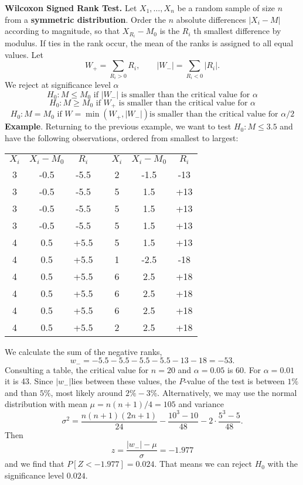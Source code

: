 \documentclass[a4paper,12pt]{article}
\begin{document}
\textbf{Wilcoxon Signed Rank Test.} Let $X_1, \ldots, X_n$ be a random sample of size $n$ from a \textbf{symmetric distribution}. Order the $n$ absolute differences $\left|X_i-M\right|$ according to magnitude, so that $X_{R_i}-M_0$ is the $R_i$ th smallest difference by modulus. If ties in the rank occur, the mean of the ranks is assigned to all equal values.
Let
$$
W_{+}=\sum_{R_i>0} R_i, \quad \quad\left|W_{-}\right|=\sum_{R_i<0}\left|R_i\right| .
$$
We reject at significance level $\alpha$
$$H_0: M \leq M_0\text{ if }\left|W_{-}\right| \text{ is smaller than the critical value for } \alpha$$
$$H_0: M \geq M_0\text{ if }W_{+} \text{ is smaller than the critical value for } \alpha$$
$$H_0: M=M_0\text{ if }W=\min \left(W_{+},\left|W_{-}\right|\right) \text{is smaller than the critical value for } \alpha / 2$$
\textbf{Example}. Returning to the previous example, we want to test $H_0: M \leq 3.5$ and have the following observations, ordered from smallest to largest:
\begin{center}
\begin{tabular}{ccccccc}
\hline$X_i$ & $X_i-M_0$ & $R_i$ & & $X_i$ & $X_i-M_0$ & $R_i$ \\
\cline { 1 - 3 } \cline { 5 - 7 } 3 & -0.5 & -5.5 & & 2 & -1.5 & -13 \\
3 & -0.5 & -5.5 & & 5 & 1.5 & +13 \\
3 & -0.5 & -5.5 & & 5 & 1.5 & +13 \\
3 & -0.5 & -5.5 & & 5 & 1.5 & +13 \\
4 & 0.5 & +5.5 & & 5 & 1.5 & +13 \\
4 & 0.5 & +5.5 & & 1 & -2.5 & -18 \\
4 & 0.5 & +5.5 & & 6 & 2.5 & +18 \\
4 & 0.5 & +5.5 & & 6 & 2.5 & +18 \\
4 & 0.5 & +5.5 & & 6 & 2.5 & +18 \\
4 & 0.5 & +5.5 & & 2 & 2.5 & +18 \\
\hline
\end{tabular}
\end{center}
We calculate the sum of the negative ranks,
$$
w_{-}=-5.5-5.5-5.5-5.5-13-18=-53 .
$$
Consulting a table, the critical value for $n=20$ and $\alpha=0.05$ is 60. For $\alpha=0.01$ it is 43. Since $\left|w_{-}\right|$lies between these values, the $P$-value of the test is between $1 \%$ and than $5 \%$, most likely around $2 \%-3 \%$.
Alternatively, we may use the normal distribution with mean $\mu=n(n+1) / 4=105$ and variance
$$
\sigma^2=\frac{n(n+1)(2 n+1)}{24}-\frac{10^3-10}{48}-2 \cdot \frac{5^3-5}{48} .
$$
Then
$$
z=\frac{\left|w_{-}\right|-\mu}{\sigma}=-1.977
$$
and we find that $P[Z<-1.977]=0.024$. That means we can reject $H_0$ with the significance level $0.024$.\\
\end{document}
